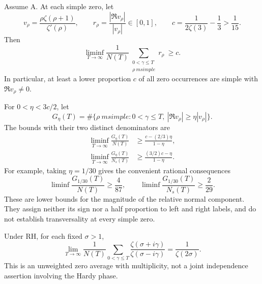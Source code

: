 \begin{theorem}
\label{thm:analytic-arithmetic-transverse-proportion}
Assume A. At each simple zero, let
\[
 v_\rho=\frac{\rho\zeta(\rho+1)}{\zeta'(\rho)},\qquad
 r_\rho=\frac{|\Re v_\rho|}{|v_\rho|}\in[0,1],\qquad
 c=\frac1{2\zeta(3)}-\frac13>\frac1{15}.
\]
Then
\begin{equation}\label{eq:analytic-normal-mean}
 \liminf_{T\to\infty}\frac1{N(T)}
                 \sum_{\substack{0<\gamma\le T\\\rho\ {
m simple}}}
                           r_\rho\ \ge c.
\end{equation}
In particular, at least a lower proportion $c$ of all zero
occurrences are simple with $\Re v_\rho\ne0$.

For $0<\eta<3c/2$, let
\[
 G_\eta(T)=\#\{\rho\ {
m simple}:0<\gamma\le T,
                              \ |\Re v_\rho|\ge\eta|v_\rho|\}.
\]
The bounds with their two distinct denominators are
\begin{align}
 \liminf_{T\to\infty}\frac{G_\eta(T)}{N(T)}
       &\ge\frac{c-(2/3)\eta}{1-\eta},
         \label{eq:analytic-total-transverse-density}\\
 \liminf_{T\to\infty}\frac{G_\eta(T)}{N_s(T)}
       &\ge\frac{(3/2)c-\eta}{1-\eta}.
         \label{eq:analytic-simple-transverse-density}
\end{align}
For example, taking $\eta=1/30$ gives the convenient rational
consequences
\[
 \liminf\frac{G_{1/30}(T)}{N(T)}\ge\frac4{87},\qquad
 \liminf\frac{G_{1/30}(T)}{N_s(T)}\ge\frac2{29}.
\]
These are lower bounds for the magnitude of the relative
normal component. They assign neither its sign nor a half
proportion to left and right labels, and do not establish
transversality at every simple zero.
\end{theorem}

\begin{lemma}
\label{lem:analytic-exterior-phase-average}
Under RH, for each fixed $\sigma>1$,
\begin{equation}\label{eq:analytic-exterior-ratio-mean}
 \lim_{T\to\infty}\frac1{N(T)}
       \sum_{0<\gamma\le T}
       \frac{\zeta(\sigma+i\gamma)}
            {\zeta(\sigma-i\gamma)}
                     =\frac1{\zeta(2\sigma)}.
\end{equation}
This is an unweighted zero average with multiplicity, not a
joint independence assertion involving the Hardy phase.
\end{lemma}

